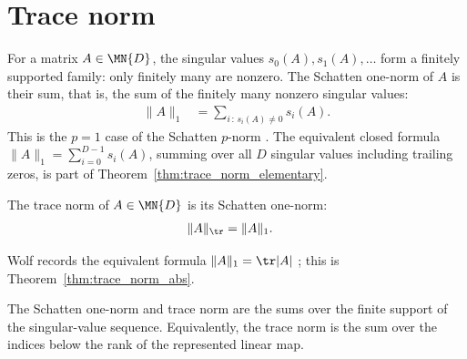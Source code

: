 \section{Trace norm}

\begin{definition}\label{def:schatten_one_norm}
    \leanok
    For a matrix $A\in\MN{D}$, the singular values $s_0(A),s_1(A),\ldots$ form
    a finitely supported family: only finitely many are nonzero. The Schatten
    one-norm of $A$ is their sum, that is, the sum of the finitely many nonzero
    singular values:
    \begin{align}
        \lVert A\rVert_1
        &=\sum_{i\,:\,s_i(A)\neq 0}s_i(A).
        \label{eq:entropy_schatten_one_norm}
    \end{align}
    This is the $p=1$ case of the Schatten $p$-norm
    \cite[Chapter~8, Section~8.1]{Wolf2012Quantum}. The equivalent closed
    formula $\lVert A\rVert_1=\sum_{i=0}^{D-1}s_i(A)$, summing over all $D$
    singular values including trailing zeros, is part of
    Theorem~\ref{thm:trace_norm_elementary}.
\end{definition}

\begin{definition}\label{def:trace_norm}
    \leanok
    The trace norm of $A\in\MN{D}$ is its Schatten one-norm:
    \begin{align}
        \lVert A\rVert_{\tr}
        &=\lVert A\rVert_1.
        \label{eq:entropy_trace_norm}
    \end{align}
\end{definition}

Wolf records the equivalent formula
$\lVert A\rVert_1=\tr\lvert A\rvert$
\cite[Chapter~8, Section~8.1]{Wolf2012Quantum}; this is
Theorem~\ref{thm:trace_norm_abs}.

\begin{theorem}\label{thm:trace_norm_singular_values}
    \leanok
    The Schatten one-norm and trace norm are the sums over the finite support of
    the singular-value sequence. Equivalently, the trace norm is the sum over
    the indices below the rank of the represented linear map.
\end{theorem}

